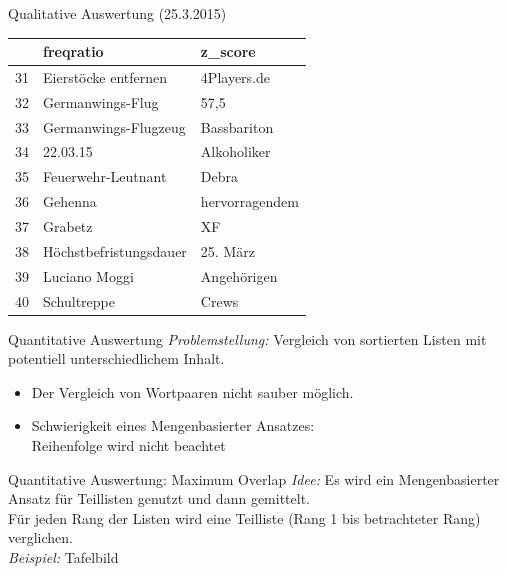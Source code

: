 \documentclass{beamer}
\begin{document}
\begin{frame}{Qualitative Auswertung (25.3.2015)}
\begin{table}[ht]
\centering
\begin{tabular}{rll}
  \hline
 & freqratio & z\_score \\ 
  \hline
31 & Eierstöcke entfernen & 4Players.de \\ 
  32 & Germanwings-Flug & 57,5 \\ 
  33 & Germanwings-Flugzeug & Bassbariton \\ 
  34 & 22.03.15 & Alkoholiker \\ 
  35 & Feuerwehr-Leutnant & Debra \\ 
  36 & Gehenna & hervorragendem \\ 
  37 & Grabetz & XF \\ 
  38 & Höchstbefristungsdauer & 25. März \\ 
  39 & Luciano Moggi & Angehörigen \\ 
  40 & Schultreppe & Crews \\ 
   \hline
\end{tabular}
\end{table}
\end{frame}

\begin{frame}{Quantitative Auswertung}
	\emph{Problemstellung: }Vergleich von sortierten Listen mit potentiell unterschiedlichem Inhalt.
	\begin{itemize}
		\item{Der Vergleich von Wortpaaren nicht sauber m\"oglich.}
		\item{Schwierigkeit eines Mengenbasierter Ansatzes:\\Reihenfolge wird nicht beachtet }
	\end{itemize}	
\end{frame}


\begin{frame}{Quantitative Auswertung: Maximum Overlap}
	\emph{Idee: } Es wird ein Mengenbasierter Ansatz f\"ur Teillisten genutzt und dann gemittelt.\\
	F\"ur jeden Rang der Listen wird eine Teilliste (Rang 1 bis betrachteter Rang) verglichen.\\
	\vspace{1cm}
	\emph{Beispiel:} Tafelbild
\end{frame}
\end{document}
